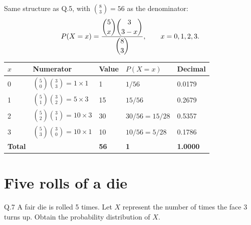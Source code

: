 \begin{solution}
Same structure as Q.5, with $\binom{8}{3}=56$ as the denominator:
\[
P(X=x)=\frac{\dbinom{5}{x}\dbinom{3}{3-x}}{\dbinom{8}{3}},\qquad x=0,1,2,3 .
\]

\begin{center}
\small\sffamily
\begin{tabular}{@{}C{1.4cm} L{4.6cm} C{2.0cm} C{2.2cm} C{1.8cm}@{}}
\toprule
$x$ & Numerator & Value & $P(X=x)$ & Decimal \\
 & $\binom{5}{0}\binom{3}{3}=1\times 1$  & 1  & $1/56$          & 0.0179 \\
1 & $\binom{5}{1}\binom{3}{2}=5\times 3$  & 15 & $15/56$         & 0.2679 \\
2 & $\binom{5}{2}\binom{3}{1}=10\times 3$ & 30 & $30/56=15/28$   & 0.5357 \\
3 & $\binom{5}{3}\binom{3}{0}=10\times 1$ & 10 & $10/56=5/28$    & 0.1786 \\
\midrule
\textbf{Total} & & \textbf{56} & \textbf{1} & \textbf{1.0000} \\
\bottomrule
\end{tabular}
\end{center}


\end{solution}

\section{Five rolls of a die}

\begin{question}{Q.7}
A fair die is rolled 5 times. Let $X$ represent the number of times the face 3
turns up. Obtain the probability distribution of $X$.
\end{question}

